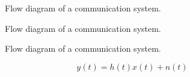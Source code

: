 \begin{figure}[h]
	\centering
	
	\caption{Flow diagram of a communication system.}
\end{figure}

\begin{figure}[h]
	\centering
	
	\caption{Flow diagram of a communication system.}
\end{figure}

\begin{figure}[h]
	\centering
	
	\caption{Flow diagram of a communication system.}
\end{figure}
\begin{equation}
	y(t)
	=
	h(t)x(t)
	+
	n(t)
\end{equation}